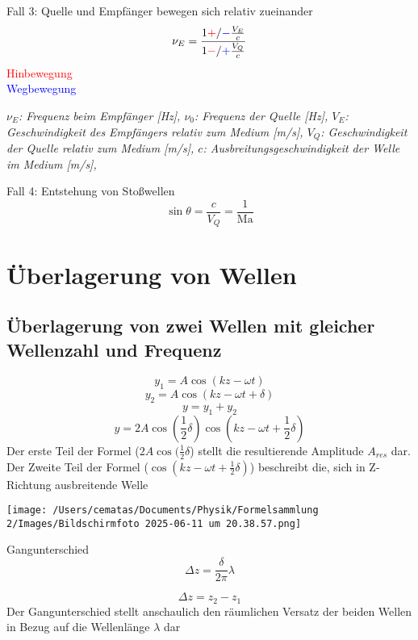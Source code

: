 \documentclass[a4paper,10pt]{article}
\newenvironment{displayformula}
{
	\begin{framed}
		\color{formulaColor}
	}
	{\end{framed}}
\newcommand{\formulalegend}[1]{%
	\par\vspace{0.5ex}%
	{{\color{legendColor}\RaggedRight\small\textit{#1}}}%
	\par\vspace{1.5ex}%
}
\begin{document}
\begin{displayformula}
	Fall 3: Quelle und Empfänger bewegen sich relativ zueinander
	\[
	\nu_E = \frac{1 \textcolor{red}{+} / \textcolor{blue}{-} \frac{V_E}{c}}{1 \textcolor{red}{-} / \textcolor{blue}{+} \frac{V_Q}{c}}
	\]
	\textcolor{red}{Hinbewegung} \\
	\textcolor{blue}{Wegbewegung}
\end{displayformula}

\formulalegend{
	$\nu_E$: Frequenz beim Empfänger [Hz], 
	$\nu_0$: Frequenz der Quelle [Hz], 
	$V_E$: Geschwindigkeit des Empfängers relativ zum Medium [m/s], 
	$V_Q$: Geschwindigkeit der Quelle relativ zum Medium [m/s], 
	$c$: Ausbreitungsgeschwindigkeit der Welle im Medium [m/s], 
}

\begin{displayformula}
	Fall 4: Entstehung von Stoßwellen
	\[
	\sin \theta = \frac{c}{V_Q} = \frac{1}{\text{Ma}}
	\]
\end{displayformula}



\section{Überlagerung von Wellen}

\subsection{Überlagerung von zwei Wellen mit gleicher Wellenzahl und Frequenz}
\begin{displayformula}
\[
y_1 = A \cos (kz - \omega t)
\]
\[
y_2 = A \cos (kz - \omega t + \delta)
\]
\[
y = y_1 + y_2
\]
\[
y = 2 A \cos (\frac{1}{2} \delta) \cos (kz - \omega t + \frac{1}{2} \delta)
\]
Der erste Teil der Formel ($2A \cos (\frac{1}{2} \delta$) stellt die resultierende Amplitude $A_{res}$ dar. \\
Der Zweite Teil der Formel ($\cos (kz - \omega t + \frac{1}{2} \delta)$) beschreibt die, sich in Z-Richtung ausbreitende Welle
\end{displayformula}

\texttt{[image: /Users/cematas/Documents/Physik/Formelsammlung 2/Images/Bildschirmfoto 2025-06-11 um 20.38.57.png]}

\begin{displayformula}
	Gangunterschied
	\[
	\Delta z = \frac{\delta}{2 \pi} \lambda
	\]
	
	\[
	\Delta z = z_2 - z_1
	\]
	Der Gangunterschied stellt anschaulich den räumlichen Versatz der beiden Wellen in Bezug auf die Wellenlänge $\lambda$ dar
\end{displayformula}
\end{document}
